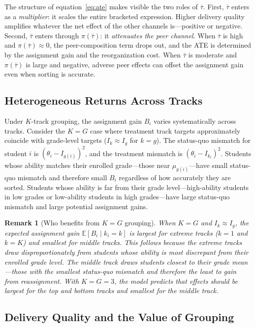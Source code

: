 \documentclass[11pt]{article}
\newtheorem{remark}{Remark}
\newcommand{\E}{\mathbb{E}}
\begin{document}
The structure of equation~\eqref{eq:ate} makes visible the two roles of $\bar{\tau}$. First, $\bar{\tau}$ enters as a \emph{multiplier}: it scales the entire bracketed expression. Higher delivery quality amplifies whatever the net effect of the other channels is---positive or negative. Second, $\bar{\tau}$ enters through $\pi(\bar{\tau})$: it \emph{attenuates the peer channel}. When $\bar{\tau}$ is high and $\pi(\bar{\tau}) \approx 0$, the peer-composition term drops out, and the ATE is determined by the assignment gain and the reorganization cost. When $\bar{\tau}$ is moderate and $\pi(\bar{\tau})$ is large and negative, adverse peer effects can offset the assignment gain even when sorting is accurate.

\subsection{Heterogeneous Returns Across Tracks}

Under $K$-track grouping, the assignment gain $B_i$ varies systematically across tracks. Consider the $K = G$ case where treatment track targets approximately coincide with grade-level targets ($I_k \approx I_g$ for $k = g$). The status-quo mismatch for student $i$ is $(\theta_i - I_{g(i)})^2$, and the treatment mismatch is $(\theta_i - I_{k_i})^2$. Students whose ability matches their enrolled grade---those near $\mu_{g(i)}$---have small status-quo mismatch and therefore small $B_i$ regardless of how accurately they are sorted. Students whose ability is far from their grade level---high-ability students in low grades or low-ability students in high grades---have large status-quo mismatch and large potential assignment gains.

\begin{remark}[Who benefits from $K = G$ grouping]
\label{rem:tail_effects}
When $K = G$ and $I_k \approx I_g$, the expected assignment gain $\E[B_i \mid k_i = k]$ is largest for extreme tracks ($k = 1$ and $k = K$) and smallest for middle tracks. This follows because the extreme tracks draw disproportionately from students whose ability is most discrepant from their enrolled grade level. The middle track draws students closest to their grade mean---those with the smallest status-quo mismatch and therefore the least to gain from reassignment. With $K = G = 3$, the model predicts that effects should be largest for the top and bottom tracks and smallest for the middle track.
\end{remark}

\subsection{Delivery Quality and the Value of Grouping}
\end{document}
